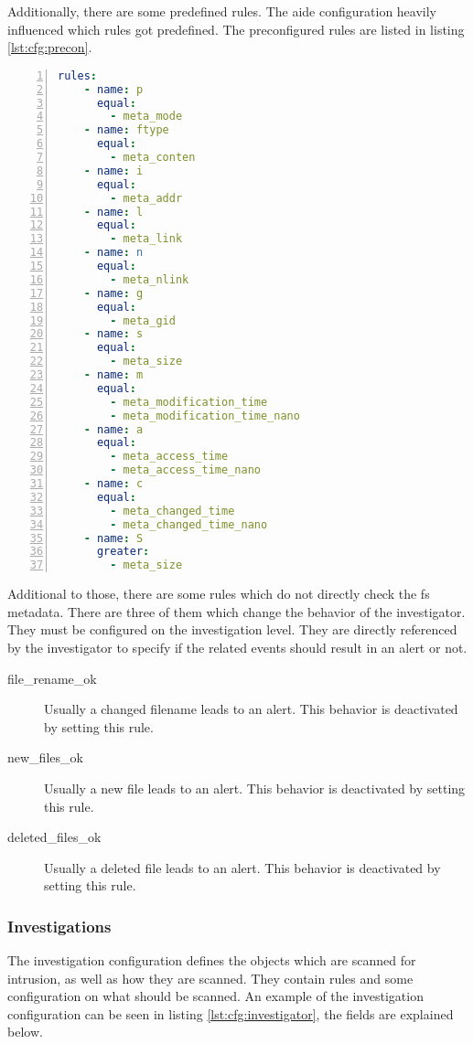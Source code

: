 Additionally, there are some predefined rules. The aide configuration heavily influenced which rules got predefined. The preconfigured rules are listed in listing \ref{lst:cfg:precon}.
\begin{lstlisting}[language=yaml, numbers=left, caption=Preconfigured Rules, label=lst:cfg:precon]
rules: 
	- name: p
	  equal:
		- meta_mode
	- name: ftype
	  equal:
		- meta_conten
	- name: i
	  equal:
		- meta_addr
	- name: l
	  equal:
		- meta_link
	- name: n
	  equal:
		- meta_nlink 
	- name: g
	  equal:
		- meta_gid
	- name: s
	  equal:
		- meta_size
	- name: m
	  equal:
		- meta_modification_time
		- meta_modification_time_nano
	- name: a
	  equal:
		- meta_access_time
		- meta_access_time_nano
	- name: c
	  equal:
		- meta_changed_time
		- meta_changed_time_nano
	- name: S
	  greater:
		- meta_size
\end{lstlisting}
	
Additional to those, there are some rules which do not directly check the \gls{fs} \gls{metadata}. There are three of them which change the behavior of the investigator. They must be configured on the investigation level. They are directly referenced by the investigator to specify if the related events should result in an alert or not. 

\begin{description}
    \item [file\_rename\_ok]    Usually a changed filename leads to an alert. This behavior is deactivated by setting this rule.
    \item [new\_files\_ok]    Usually a new file leads to an alert. This behavior is deactivated by setting this rule.
    \item [deleted\_files\_ok]    Usually a deleted file leads to an alert. This behavior is deactivated by setting this rule.
\end{description}

\subsubsection{Investigations}
\label{sec:config:investigations}

The investigation configuration defines the objects which are scanned for intrusion, as well as how they are scanned. They contain rules and some configuration on what should be scanned. An example of the investigation configuration can be seen in listing \ref{lst:cfg:investigator}, the fields are explained below.

